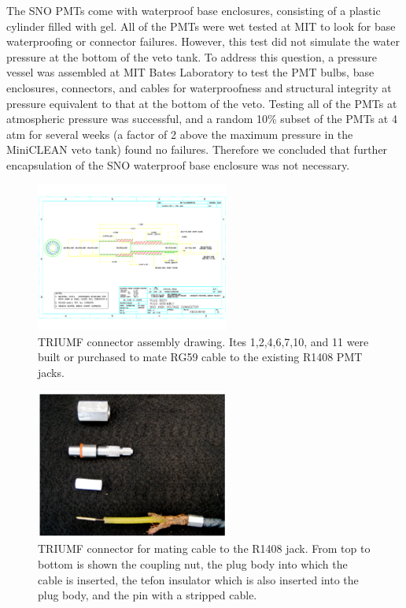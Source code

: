 \documentclass{JINST}
\begin{document}
The SNO PMTs come with waterproof base enclosures, consisting of a
plastic cylinder filled with gel.  All of the PMTs were wet tested at
MIT to look for base waterproofing or connector failures.  However,
this test did not simulate the water pressure at the bottom of the
veto tank.  To address this question, a pressure vessel was assembled
at MIT Bates Laboratory to test the PMT bulbs, base enclosures, connectors, and
cables for waterproofness and structural integrity at pressure
equivalent to that at the bottom of the veto. Testing
all of the PMTs at atmospheric pressure was successful, and a random
10\% subset of the PMTs at 4 atm for several weeks (a factor of 2
above the maximum pressure in the MiniCLEAN veto tank) found no
failures.  Therefore we concluded that further encapsulation of the
SNO waterproof base enclosure was not necessary.

\begin{figure}[ht]
\begin{center}
\includegraphics[width=2.5in,page=13]{graphics/snoConnectorDrawings.pdf}
\caption{TRIUMF connector assembly drawing.  Ites 1,2,4,6,7,10, and 11 were built or purchased to mate RG59 cable to the existing R1408 PMT jacks.
\label{fig:connectordrawing}}
\end{center}
\end{figure}

\begin{figure}[ht]
\begin{center}
\includegraphics[width=2.5in]{graphics/connectorpic.pdf}
\caption{TRIUMF connector for mating cable to the R1408 jack.  From top to bottom is shown the coupling nut, the plug body into which the cable is inserted, the tefon insulator which is also inserted into the plug body, and the pin with a stripped cable.
\label{fig:connectorpic}}
\end{center}
\end{figure}
\end{document}
